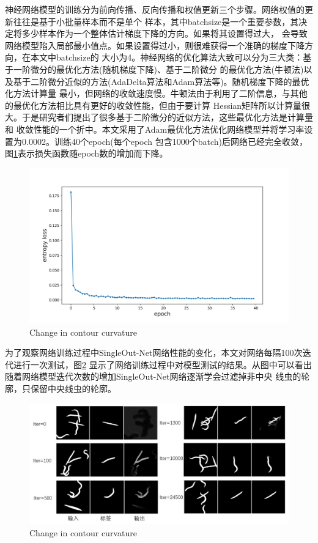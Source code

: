 	神经网络模型的训练分为前向传播、反向传播和权值更新三个步骤。网络权值的更新往往是基于小批量样本而不是单个
	样本，其中batchsize是一个重要参数，其决定将多少样本作为一个整体估计梯度下降的方向。如果将其设置得过大，
	会导致网络模型陷入局部最小值点。如果设置得过小，则很难获得一个准确的梯度下降方向，在本文中batchsize的
	大小为4。神经网络的优化算法大致可以分为三大类：基于一阶微分的最优化方法(随机梯度下降)、基于二阶微分
	的最优化方法(牛顿法)以及基于二阶微分近似的方法(AdaDelta算法\cite{zeiler2012adadelta}和Adam算法\cite{kinga2015method}等)。随机梯度下降的最优化方法计算量
	最小，但网络的收敛速度慢。牛顿法由于利用了二阶信息，与其他的最优化方法相比具有更好的收敛性能，但由于要计算
	Hessian矩阵所以计算量很大。于是研究者们提出了很多基于二阶微分的近似方法，这些最优化方法是计算量和
	收敛性能的一个折中。本文采用了Adam最优化方法优化网络模型并将学习率设置为0.0002。训练40个epoch(每个epoch
	包含1000个batch)后网络已经完全收敛，图\ref{fig:chap4:loss}表示损失函数随epoch数的增加而下降。
	\begin{figure}[thb]
	  \centering
	  \includegraphics[width=13cm]{figure/chap4/loss.jpg}
		{Change in contour curvature}
	  \label{fig:chap4:loss}
	\end{figure}
	
	为了观察网络训练过程中SingleOut-Net网络性能的变化，本文对网络每隔100次迭代进行一次测试，图\ref{fig:chap4:progress}
	显示了网络训练过程中对模型测试的结果。从图中可以看出随着网络模型迭代次数的增加SingleOut-Net网络逐渐学会过滤掉非中央
	线虫的轮廓，只保留中央线虫的轮廓。
		\begin{figure}[htb]
	  \centering
	  \includegraphics[width=13cm]{figure/chap4/progress.jpg}
		{Change in contour curvature}
	  \label{fig:chap4:progress}
	\end{figure}
